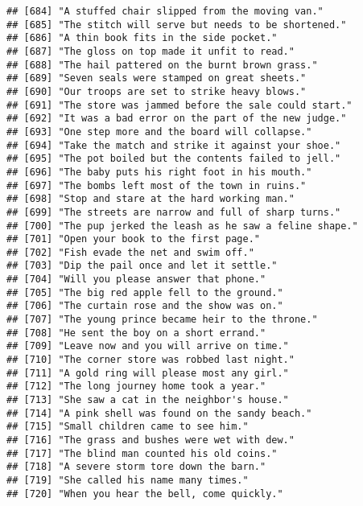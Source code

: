\documentclass[
]{article}
\begin{document}
\begin{verbatim}
## [684] "A stuffed chair slipped from the moving van."             
## [685] "The stitch will serve but needs to be shortened."         
## [686] "A thin book fits in the side pocket."                     
## [687] "The gloss on top made it unfit to read."                  
## [688] "The hail pattered on the burnt brown grass."              
## [689] "Seven seals were stamped on great sheets."                
## [690] "Our troops are set to strike heavy blows."                
## [691] "The store was jammed before the sale could start."        
## [692] "It was a bad error on the part of the new judge."         
## [693] "One step more and the board will collapse."               
## [694] "Take the match and strike it against your shoe."          
## [695] "The pot boiled but the contents failed to jell."          
## [696] "The baby puts his right foot in his mouth."               
## [697] "The bombs left most of the town in ruins."                
## [698] "Stop and stare at the hard working man."                  
## [699] "The streets are narrow and full of sharp turns."          
## [700] "The pup jerked the leash as he saw a feline shape."       
## [701] "Open your book to the first page."                        
## [702] "Fish evade the net and swim off."                         
## [703] "Dip the pail once and let it settle."                     
## [704] "Will you please answer that phone."                       
## [705] "The big red apple fell to the ground."                    
## [706] "The curtain rose and the show was on."                    
## [707] "The young prince became heir to the throne."              
## [708] "He sent the boy on a short errand."                       
## [709] "Leave now and you will arrive on time."                   
## [710] "The corner store was robbed last night."                  
## [711] "A gold ring will please most any girl."                   
## [712] "The long journey home took a year."                       
## [713] "She saw a cat in the neighbor's house."                   
## [714] "A pink shell was found on the sandy beach."               
## [715] "Small children came to see him."                          
## [716] "The grass and bushes were wet with dew."                  
## [717] "The blind man counted his old coins."                     
## [718] "A severe storm tore down the barn."                       
## [719] "She called his name many times."                          
## [720] "When you hear the bell, come quickly."
\end{verbatim}
\end{document}

